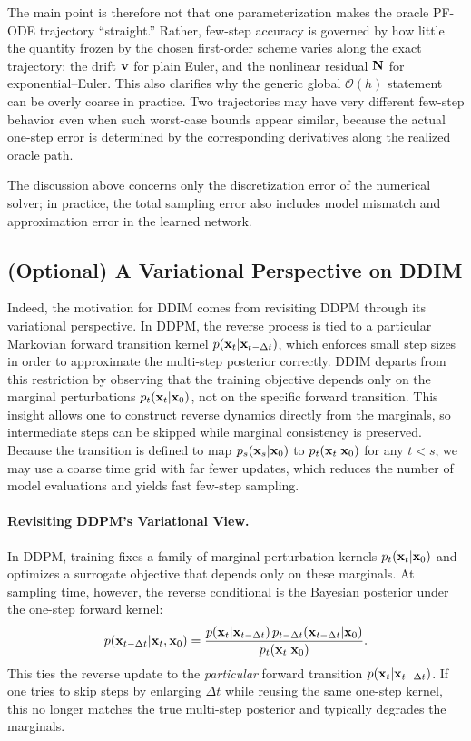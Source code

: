 The main point is therefore not that one parameterization makes the
oracle PF-ODE trajectory ``straight.'' Rather, few-step accuracy is
governed by how little the quantity frozen by the chosen first-order
scheme varies along the exact trajectory: the drift ${\mathbf{v}}$ for plain
Euler, and the nonlinear residual ${\mathbf{N}}$ for exponential--Euler. This
also clarifies why the generic global $\mathcal O(h)$ statement can be
overly coarse in practice. Two trajectories may have very different
few-step behavior even when such worst-case bounds appear similar,
because the actual one-step error is determined by the corresponding
derivatives along the realized oracle path. 

The discussion above
concerns only the discretization error of the numerical solver; in
practice, the total sampling error also includes model mismatch and
approximation error in the learned network.


\subsection{(Optional) A Variational Perspective on DDIM}\label{subsec:ddim}

Indeed, the motivation for DDIM comes from revisiting DDPM through
its variational perspective. In DDPM, the reverse process is tied
to a particular Markovian forward transition kernel
$p({\mathbf{x}}_t|{\mathbf{x}}_{t-\Delta t})$, which enforces small step sizes in
order to approximate the multi-step posterior correctly. DDIM
departs from this restriction by observing that the training
objective depends only on the marginal perturbations
$p_t({\mathbf{x}}_t|{\mathbf{x}}_0)$, not on the specific forward transition.
This insight allows one to construct reverse dynamics directly from the
marginals, so intermediate steps can be skipped while marginal consistency is
preserved. Because the transition is defined to map $p_s({\mathbf{x}}_s|{\mathbf{x}}_0)$ to
$p_t({\mathbf{x}}_t|{\mathbf{x}}_0)$ for any $t<s$, we may use a coarse time grid with far fewer
updates, which reduces the number of model evaluations and yields fast few-step
sampling.



\paragraph{Revisiting DDPM's Variational View.}
In DDPM, training fixes a family of marginal perturbation kernels
$p_t({\mathbf{x}}_t|{\mathbf{x}}_0)$ and optimizes a surrogate objective that depends only on these
marginals. At sampling time, however, the reverse conditional is the Bayesian posterior under the one-step forward kernel:
\[
p({\mathbf{x}}_{t-\Delta t}|{\mathbf{x}}_t,{\mathbf{x}}_0)
= \frac{p({\mathbf{x}}_t|{\mathbf{x}}_{t-\Delta t})\,p_{t-\Delta t}({\mathbf{x}}_{t-\Delta t}|{\mathbf{x}}_0)}
       {p_t({\mathbf{x}}_t|{\mathbf{x}}_0)}.
\]
This ties the reverse update to the \emph{particular} forward transition $p({\mathbf{x}}_t|{\mathbf{x}}_{t-\Delta t})$.
If one tries to skip steps by enlarging $\Delta t$ while reusing the same one-step kernel, this
no longer matches the true multi-step posterior and typically degrades the marginals.


